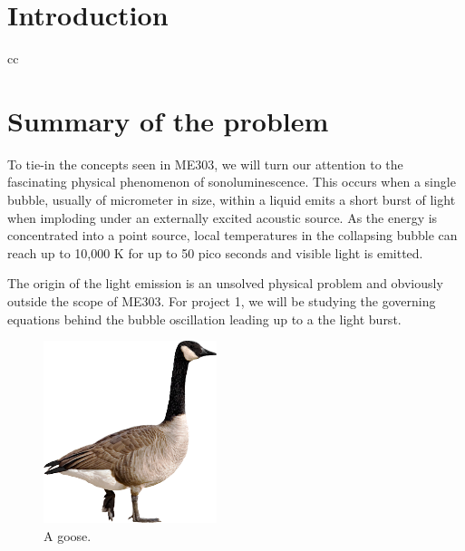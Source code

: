 \documentclass[12pt]{article}
\begin{document}



\renewcommand{\contentsname}{Table of Content}

\tableofcontents
\newpage
\listoffigures
\newpage
\listoftables
\newpage

\section{Introduction}
cc
\section{Summary of the problem}


To tie-in the concepts seen in ME303, we will turn our attention to the fascinating physical phenomenon of sonoluminescence. This occurs when a single bubble, usually of micrometer in size, within a liquid emits a short burst of light when imploding under an externally excited acoustic source. As the energy is concentrated into a point source, local temperatures in the collapsing bubble can reach up to 10,000 K for up to 50 pico seconds and visible light is emitted.

The origin of the light emission is an unsolved physical problem and obviously outside the scope of ME303. For project 1, we will be studying the governing equations behind the bubble oscillation leading up to a the light burst.
\begin{figure}[h!]
\centering
\includegraphics[width=0.45\textwidth]{figures/goose.png} 
\caption{A goose.}
\label{goose}
\end{figure}
\end{document}
